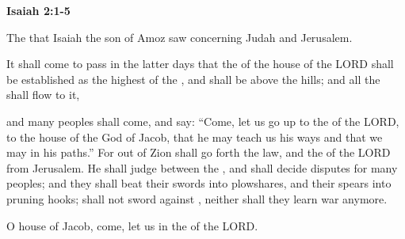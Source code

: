 \documentclass[11pt]{article}
\begin{document}
\begin{center}
{\Huge\bfseries Isaiah 2:1-5}
\end{center}
\vspace{10pt}

\newpage{}

\begin{biblicaloutline}[Isaiah 2:1-5]
    

    \begin{versesection}{2em}
         The  that Isaiah the son of Amoz saw concerning Judah and Jerusalem.
    \end{versesection}
    
    
    \begin{versesection}{2em}
         It shall come to pass in the latter days
        \poetryline that the  of the house of the LORD
        shall be established as the highest of the ,
        \poetryline and shall be  above the hills;
        and all the  shall flow to it,
        
        \poetryline  and many peoples shall come, and say:
        ``Come, let us go up to the  of the LORD,
        \poetryline to the house of the God of Jacob,
        that he may teach us his ways
        \poetryline and that we may  in his paths.''
        For out of Zion shall go forth the law,
        \poetryline and the  of the LORD from Jerusalem.
         He shall judge between the ,
        \poetryline and shall decide disputes for many peoples;
        and they shall beat their swords into plowshares,
        \poetryline and their spears into pruning hooks;
         shall not  sword against ,
        \poetryline neither shall they learn war anymore.
        
         O house of Jacob,
        \poetryline come, let us 
        \poetryline in the  of the LORD.
    \end{versesection}

\end{biblicaloutline}
\end{document}
